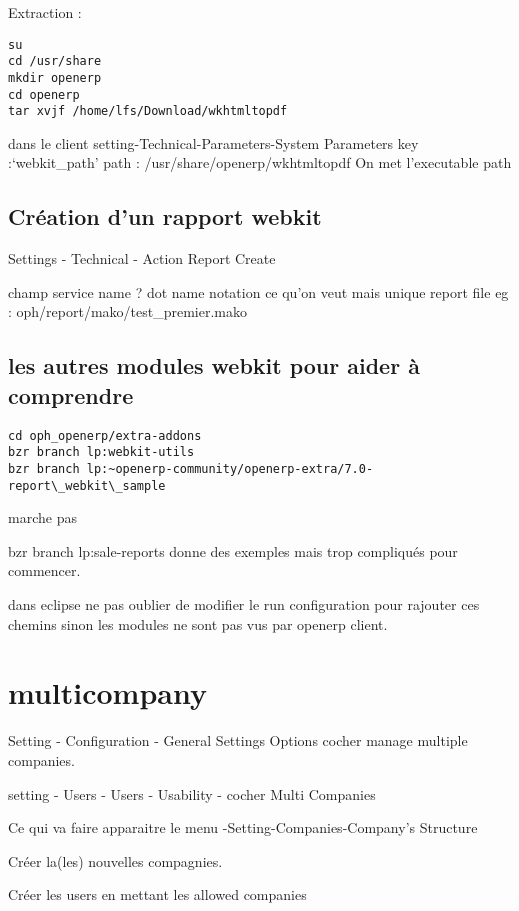 \documentclass[12pt,a4paper]{article}
\begin{document}
Extraction : 
\begin{verbatim}
su
cd /usr/share 
mkdir openerp
cd openerp
tar xvjf /home/lfs/Download/wkhtmltopdf
\end{verbatim}

dans le client 
setting-Technical-Parameters-System Parameters
key :‘webkit\_path’
path : /usr/share/openerp/wkhtmltopdf On met l'executable path

\subsection{Création d'un rapport webkit}
\label{sec:webkit_report_create}

Settings - Technical - Action  Report Create

champ service name ? dot name notation ce qu'on veut mais unique
report file  eg : oph/report/mako/test\_premier.mako

\subsection{les autres modules webkit pour aider à comprendre}
\label{sec:webkit_module}

\begin{verbatim}
cd oph_openerp/extra-addons
bzr branch lp:webkit-utils  
bzr branch lp:~openerp-community/openerp-extra/7.0-report\_webkit\_sample
\end{verbatim}

marche pas 

bzr branch lp:sale-reports donne des exemples mais trop compliqués pour commencer.

dans eclipse ne pas oublier de modifier le run configuration pour rajouter ces chemins sinon les modules ne sont pas vus par openerp client.


\section{multicompany}
\label{sec:mulicompany}

Setting - Configuration - General Settings  Options cocher manage multiple companies. 

setting - Users - Users - Usability - cocher Multi Companies

Ce qui va faire apparaitre le menu -Setting-Companies-Company's Structure

Créer la(les) nouvelles compagnies. 

Créer les users en mettant les allowed companies
\end{document}
